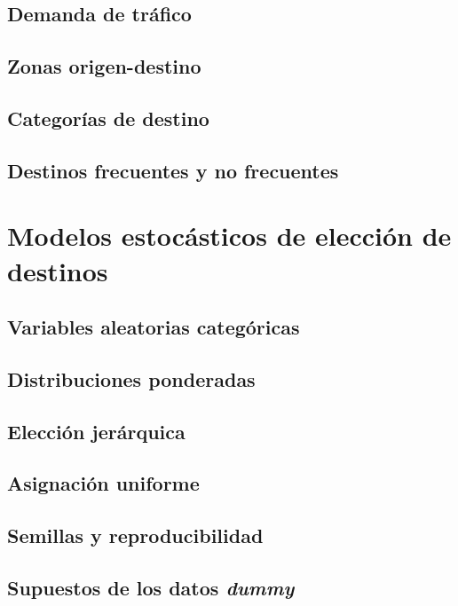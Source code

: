 \subsection{Demanda de tráfico}

\subsection{Zonas origen-destino}

\subsection{Categorías de destino}

\subsection{Destinos frecuentes y no frecuentes}

\section{Modelos estocásticos de elección de destinos}

\subsection{Variables aleatorias categóricas}

\subsection{Distribuciones ponderadas}

\subsection{Elección jerárquica}

\subsection{Asignación uniforme}

\subsection{Semillas y reproducibilidad}

\subsection{Supuestos de los datos \textit{dummy}}


